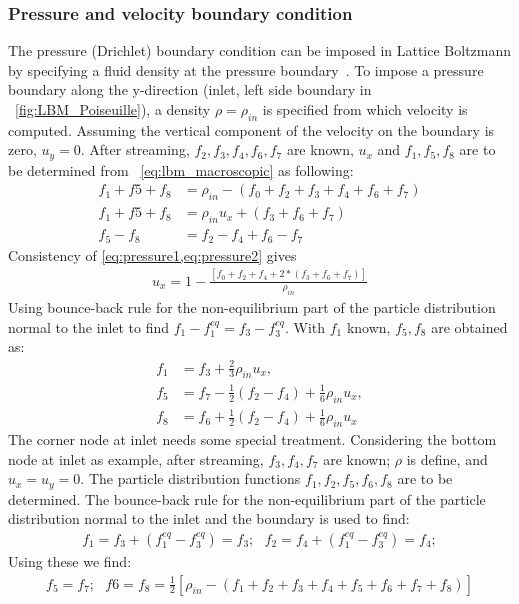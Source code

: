 \subsubsection*{Pressure and velocity boundary condition}
The pressure (Drichlet) boundary condition can be imposed in Lattice Boltzmann by specifying a fluid density at the pressure boundary~\citep{Zou1997}. To impose a pressure boundary along the y-direction (inlet, left side boundary in ~\cref{fig:LBM_Poiseuille}), a density $\rho = \rho_{in}$ is specified from which velocity is computed. Assuming the vertical component of the velocity on the boundary is zero, $u_y=0$. After streaming, $f_2, f_3, f_4, f_6, f_7$ are known, $u_x$ and $f_1, f_5, f_8$ are to be determined from ~\cref{eq:lbm_macroscopic} as following:
\begin{align}
f_1+f5+f_8 & =  \rho_{in} - (f_0+f_2+f_3+f_4+f_6+f_7) \label{eq:pressure1}\\
f_1+f5+f_8 & =  \rho_{in}u_x + (f_3+f_6+f_7) \label{eq:pressure2} \\
f_5 - f_8  & =  f_2 - f_4 +f_6 -f_7
\end{align}
\flushleft Consistency of \cref{eq:pressure1,eq:pressure2} gives
\begin{align}
u_x = 1 - \frac{[f_0+f_2+f_4+2*(f_3+f_6+f_7)]}{\rho_{in}}
\end{align}
Using bounce-back rule for the non-equilibrium part of the particle distribution normal to the inlet to find $f_1 -f_1^{eq} = f_3 -f_3^{eq}$. With $f_1$ known, $f_5,f_8$ are obtained as:
\begin{align}
f_1 & = f_3 + \frac{2}{3} \rho_{in}u_x, \nonumber \\ 
f_5 & = f_7 - \frac{1}{2}(f_2 - f_4) + \frac{1}{6}\rho_{in}u_x,\nonumber \\ 
f_8 & = f_6 + \frac{1}{2}(f_2 - f_4) + \frac{1}{6}\rho_{in}u_x
\end{align}
The corner node at inlet needs some special treatment. Considering the bottom node at inlet as example, after streaming, $f_3, f_4, f_7$ are known; $\rho$ is define, and $u_x = u_y = 0$. The particle distribution functions $f_1, f_2, f_5, f_6, f_8$ are to be determined. The bounce-back rule for the non-equilibrium part of the particle distribution normal to the inlet and the boundary is used to find:
\begin{align}
f_1 = f_3 + (f_1^{eq}-f_3^{eq}) = f_3;\mbox{ }f_2= f_4 + (f_1^{eq}-f_3^{eq}) = f_4; 
\end{align}
\flushleft Using these we find: 
\begin{align}
f_5 = f_7; \mbox{  }f6 = f_8 = \frac{1}{2}[\rho_{in} - (f_1 + f_2 + f_3 + f_4 + f_5 + f_6 + f_7 + f_8)]
\end{align}
